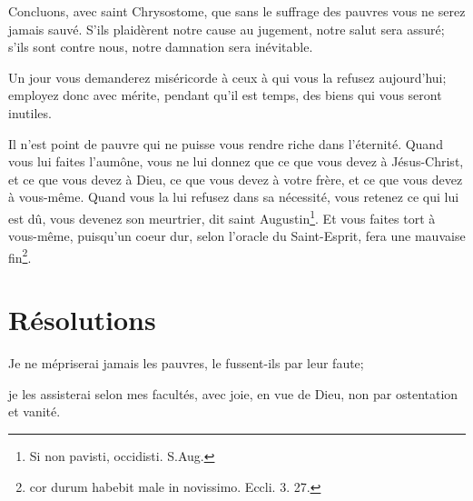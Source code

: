 \documentclass[instructions.tex]{subfiles}
\begin{document}
Concluons, avec saint Chrysostome, que sans le suffrage des pauvres vous ne serez jamais sauvé. S'ils plaidèrent notre cause au jugement, notre salut sera assuré; s'ils sont contre nous, notre damnation sera inévitable.
 
Un jour vous demanderez miséricorde à ceux à qui vous la refusez aujourd'hui; employez donc avec mérite, pendant qu'il est temps, des biens qui vous seront inutiles.
 
Il n'est point de pauvre qui ne puisse vous rendre riche dans l'éternité. Quand vous lui faites l'aumône, vous ne lui donnez que ce que vous devez à Jésus-Christ, et ce que vous devez à Dieu, ce que vous devez à votre frère, et ce que vous devez à vous-même. Quand vous la lui refusez dans sa nécessité, vous retenez ce qui lui est dû, vous devenez son meurtrier, dit saint Augustin\footnote{Si non pavisti, occidisti. S.Aug.}. Et vous faites tort à vous-même, puisqu'un coeur dur, selon l'oracle du Saint-Esprit, fera une mauvaise fin\footnote{cor durum habebit male in novissimo. Eccli. 3. 27.}.
 
\section{Résolutions}
 
\primo Je ne mépriserai jamais les pauvres, le fussent-ils par leur faute; 

\secundo je les assisterai selon mes facultés, avec joie, en vue de Dieu, non par ostentation et vanité. 


 
\end{document}
